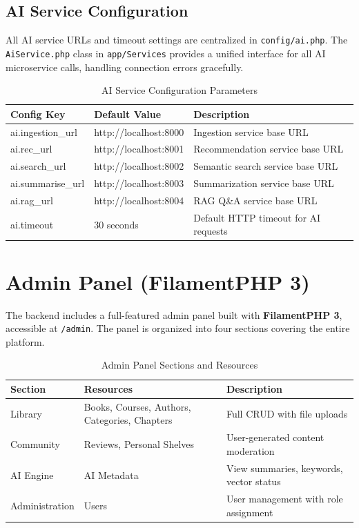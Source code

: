 \subsection{AI Service Configuration}

All AI service URLs and timeout settings are centralized in
\texttt{config/ai.php}. The \texttt{AiService.php} class in
\texttt{app/Services} provides a unified interface for all AI microservice
calls, handling connection errors gracefully.

\begin{table}[H]
\centering
\caption{AI Service Configuration Parameters}
\begin{tabularx}{\textwidth}{|l|l|X|}
\hline
\textbf{Config Key} & \textbf{Default Value} & \textbf{Description} \\
\hline
ai.ingestion\_url & http://localhost:8000 & Ingestion service base URL \\
\hline
ai.rec\_url       & http://localhost:8001 & Recommendation service base URL \\
\hline
ai.search\_url    & http://localhost:8002 & Semantic search service base URL \\
\hline
ai.summarise\_url & http://localhost:8003 & Summarization service base URL \\
\hline
ai.rag\_url       & http://localhost:8004 & RAG Q\&A service base URL \\
\hline
ai.timeout        & 30 seconds            & Default HTTP timeout for AI requests \\
\hline
\end{tabularx}
\end{table}

\section{Admin Panel (FilamentPHP 3)}
\label{sec:ch4admin}

The backend includes a full-featured admin panel built with \textbf{FilamentPHP
3}, accessible at \texttt{/admin}. The panel is organized into four sections
covering the entire platform.

\begin{table}[H]
\centering
\caption{Admin Panel Sections and Resources}
\begin{tabularx}{\textwidth}{|l|l|X|}
\hline
\textbf{Section} & \textbf{Resources} & \textbf{Description} \\
\hline
Library        & Books, Courses, Authors, Categories, Chapters & Full CRUD with file uploads \\
\hline
Community      & Reviews, Personal Shelves & User-generated content moderation \\
\hline
AI Engine      & AI Metadata & View summaries, keywords, vector status \\
\hline
Administration & Users       & User management with role assignment \\
\hline
\end{tabularx}
\end{table}

